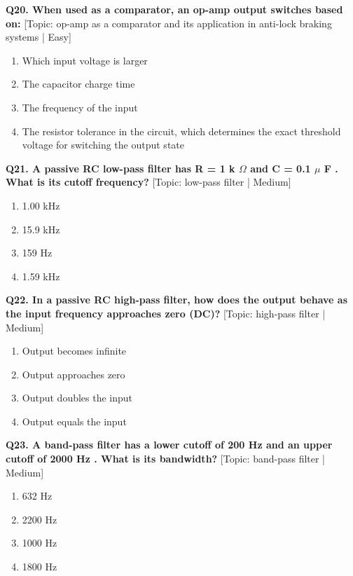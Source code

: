 \noindent\textbf{Q20. When used as a comparator, an op-amp output switches based on:} \hfill [Topic: op-amp as a comparator and its application in anti-lock braking systems | Easy]
\begin{enumerate}[label=(\alph*),topsep=2pt,itemsep=1pt,partopsep=0pt,parsep=0pt]
    \item {Which input voltage is larger}
    \item {The capacitor charge time}
    \item {The frequency of the input}
    \item {The resistor tolerance in the circuit, which determines the exact threshold voltage for switching the output state}
\end{enumerate}
\vspace{2mm}

\noindent\textbf{Q21. A passive RC low-pass filter has R = 1 k $\Omega$ and C = 0.1 $\mu$ F . What is its cutoff frequency?} \hfill [Topic: low-pass filter | Medium]
\begin{enumerate}[label=(\alph*),topsep=2pt,itemsep=1pt,partopsep=0pt,parsep=0pt]
    \item {1.00 kHz}
    \item {15.9 kHz}
    \item {159 Hz}
    \item {1.59 kHz}
\end{enumerate}
\vspace{2mm}

\noindent\textbf{Q22. In a passive RC high-pass filter, how does the output behave as the input frequency approaches zero (DC)?} \hfill [Topic: high-pass filter | Medium]
\begin{enumerate}[label=(\alph*),topsep=2pt,itemsep=1pt,partopsep=0pt,parsep=0pt]
    \item {Output becomes infinite}
    \item {Output approaches zero}
    \item {Output doubles the input}
    \item {Output equals the input}
\end{enumerate}
\vspace{2mm}

\noindent\textbf{Q23. A band-pass filter has a lower cutoff of 200 Hz and an upper cutoff of 2000 Hz . What is its bandwidth?} \hfill [Topic: band-pass filter | Medium]
\begin{enumerate}[label=(\alph*),topsep=2pt,itemsep=1pt,partopsep=0pt,parsep=0pt]
    \item {632 Hz}
    \item {2200 Hz}
    \item {1000 Hz}
    \item {1800 Hz}
\end{enumerate}
\vspace{2mm}

